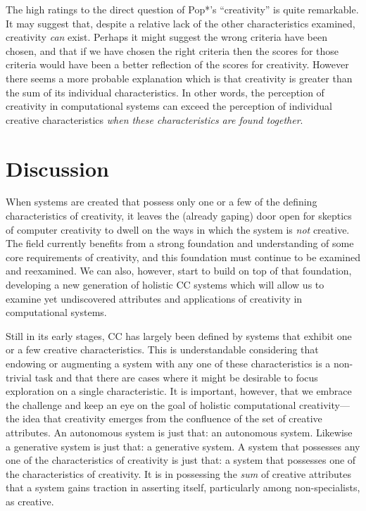 \documentclass[phd,electronic,oneside,twosidetoc,letterpaper,chaptercenter,parttop,lof,lot]{byumsphd}
\begin{document}
The high ratings to the direct question of Pop*'s ``creativity'' is quite remarkable. It may suggest that, despite a relative lack of the other characteristics examined, creativity \textit{can} exist. Perhaps it might suggest the wrong criteria have been chosen, and that if we have chosen the right criteria then the scores for those criteria would have been a better reflection of the scores for creativity. However there seems a more probable explanation which is that creativity is greater than the sum of its individual characteristics. In other words, the perception of creativity in computational systems can exceed the perception of individual creative characteristics \textit{when these characteristics are found together}.

\section{Discussion}

When systems are created that possess only one or a few of the defining characteristics of creativity, it leaves the (already gaping) door open for skeptics of computer creativity to dwell on the ways in which the system is \textit{not} creative. The field currently benefits from a strong foundation and understanding of some core requirements of creativity, and this foundation must continue to be examined and reexamined. We can also, however, start to build on top of that foundation, developing a new generation of holistic CC systems which will allow us to examine yet undiscovered attributes and applications of creativity in computational systems.

Still in its early stages, CC has largely been defined by systems that exhibit one or a few creative characteristics. This is understandable considering that endowing or augmenting a system with any one of these characteristics is a non-trivial task and that there are cases where it might be desirable to focus exploration on a single characteristic. It is important, however, that we embrace the challenge and keep an eye on the goal of holistic computational creativity---the idea that creativity emerges from the confluence of the set of creative attributes. An autonomous system is just that: an autonomous system. Likewise a generative system is just that: a generative system. A system that possesses any one of the characteristics of creativity is just that: a system that possesses one of the characteristics of creativity. It is in possessing the \textit{sum} of creative attributes that a system gains traction in asserting itself, particularly among non-specialists, as creative.
\newline
\end{document}
